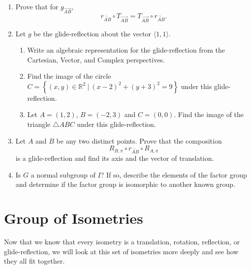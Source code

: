 \documentclass[
]{book}
\providecommand{\tightlist}{%
  \setlength{\itemsep}{0pt}\setlength{\parskip}{0pt}}
\let\stdsection\section
\renewcommand\section{\newpage\stdsection}
\theoremstyle{definition}
\theoremstyle{definition}
\theoremstyle{definition}
\theoremstyle{definition}
\theoremstyle{remark}
\begin{document}
\begin{enumerate}
\def\labelenumi{\arabic{enumi}.}
\item
  Prove that for \(g_{\overrightarrow{AB}}\), \[r_{\overleftrightarrow{AB}}\circ T_{\overrightarrow{AB}} =  T_{\overrightarrow{AB}} \circ r_{\overleftrightarrow{AB}}.\]
\item
  Let \(g\) be the glide-reflection about the vector \(\langle 1,1\rangle\).

  \begin{enumerate}
  \def\labelenumii{\alph{enumii}.}
  \tightlist
  \item
    Write an algebraic representation for the glide-reflection from the Cartesian, Vector, and Complex perspectives.
  \item
    Find the image of the circle \(C=\left\{ (x,y)\in \mathbb{R}^2 \: \vert \: (x-2)^2+(y+3)^2 =9\right\}\) under this glide-reflection.
  \item
    Let \(A=(1,2)\), \(B=(-2,3)\) and \(C=(0,0)\). Find the image of the triangle \(\triangle ABC\) under this glide-reflection.
  \end{enumerate}
\item
  Let \(A\) and \(B\) be any two distinct points. Prove that the composition \[R_{B,\pi} \circ r_{\overleftrightarrow{AB}}\circ R_{A,\pi}\] is a glide-reflection and find its axis and the vector of translation.
\item
  Is \(G\) a normal subgroup of \(I\)? If so, describe the elements of the factor group and determine if the factor group is isomorphic to another known group.
\end{enumerate}

\hypertarget{group-of-isometries}{%
\section{Group of Isometries}\label{group-of-isometries}}

Now that we know that every isometry is a translation, rotation, reflection, or glide-reflection, we will look at this set of isometries more deeply and see how they all fit together.
\end{document}
